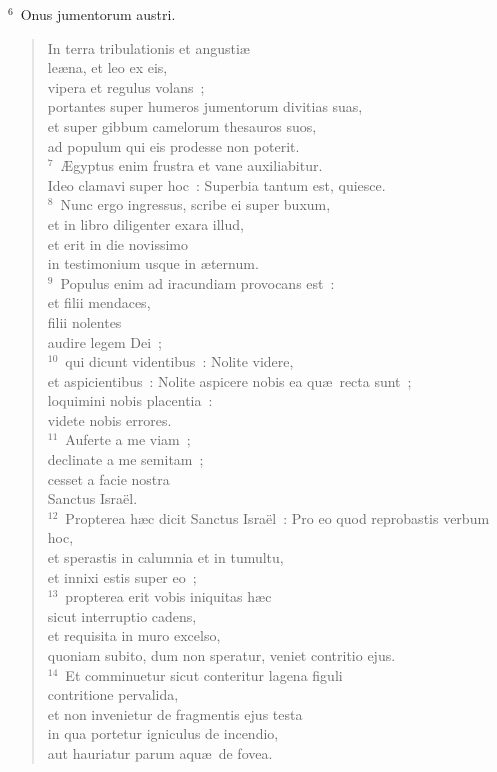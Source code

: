 ${}^{6}$~Onus jumentorum austri. \begin{verse}In terra tribulationis et angusti\ae \\ le\ae na, et leo ex eis,\\ vipera et regulus volans~;\\ portantes super humeros jumentorum divitias suas,\\ et super gibbum camelorum thesauros suos,\\ ad populum qui eis prodesse non poterit.\\
${}^{7}$~\AE gyptus enim frustra et vane auxiliabitur.\\ Ideo clamavi super hoc~: Superbia tantum est, quiesce.\\
${}^{8}$~Nunc ergo ingressus, scribe ei super buxum,\\ et in libro diligenter exara illud,\\ et erit in die novissimo\\ in testimonium usque in \ae ternum.\\
${}^{9}$~Populus enim ad iracundiam provocans est~:\\ et filii mendaces,\\ filii nolentes\\ audire legem Dei~;\\
${}^{10}$~qui dicunt videntibus~: Nolite videre,\\ et aspicientibus~: Nolite aspicere nobis ea qu\ae\ recta sunt~;\\ loquimini nobis placentia~:\\ videte nobis errores.\\
${}^{11}$~Auferte a me viam~;\\ declinate a me semitam~;\\ cesset a facie nostra\\ Sanctus Isra\"el.\\
${}^{12}$~Propterea h\ae c dicit Sanctus Isra\"el~: Pro eo quod reprobastis verbum hoc,\\ et sperastis in calumnia et in tumultu,\\ et innixi estis super eo~;\\
${}^{13}$~propterea erit vobis iniquitas h\ae c\\ sicut interruptio cadens,\\ et requisita in muro excelso,\\ quoniam subito, dum non speratur, veniet contritio ejus.\\
${}^{14}$~Et comminuetur sicut conteritur lagena figuli\\ contritione pervalida,\\ et non invenietur de fragmentis ejus testa\\ in qua portetur igniculus de incendio,\\ aut hauriatur parum aqu\ae\ de fovea.\\

\end{verse}
